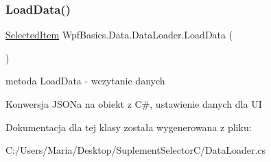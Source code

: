 \subsubsection{\texorpdfstring{Load\+Data()}{LoadData()}}
{\footnotesize\ttfamily \hyperlink{class_wpf_basics_1_1_data_1_1_selected_item}{Selected\+Item} Wpf\+Basics.\+Data.\+Data\+Loader.\+Load\+Data (\begin{DoxyParamCaption}{ }\end{DoxyParamCaption})}



metoda Load\+Data -\/ wczytanie danych 

Konwersja J\+S\+ON\textquotesingle{}a na obiekt z C\#, ustawienie danych dla UI 

Dokumentacja dla tej klasy została wygenerowana z pliku\+:\begin{DoxyCompactItemize}
\item 
C\+:/\+Users/\+Maria/\+Desktop/\+Suplement\+Selector\+C/Data\+Loader.\+cs\end{DoxyCompactItemize}
